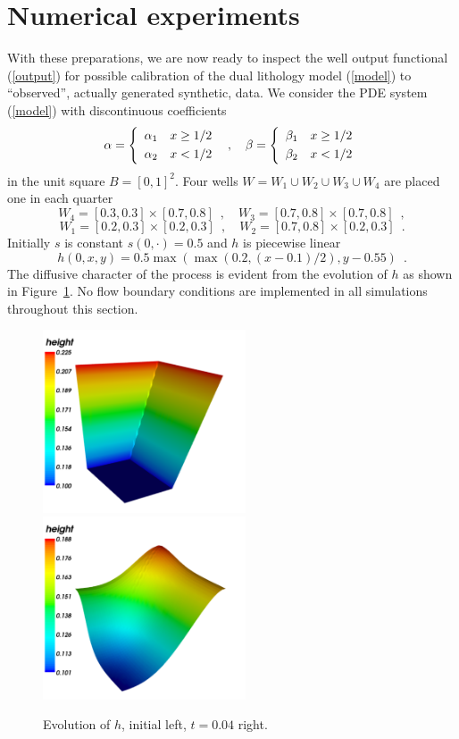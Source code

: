 \section{Numerical experiments}

With these preparations, we are now ready to inspect the well output functional (\ref{output})
for possible calibration of the dual lithology model (\ref{model}) to ``observed'',
actually generated synthetic, data.
We consider the PDE system (\ref{model}) with discontinuous coefficients
$$
 \alpha = \left\{
 \begin{array}{rl} \alpha_1 & x \ge 1/2 \\[\jot] \alpha_2 & x < 1/2 \end{array}
 \right .
 \enspace , \quad
 \beta = \left\{
 \begin{array}{rl} \beta_1 & x \ge 1/2 \\[\jot] \beta_2 & x < 1/2 \end{array}
 \right .
$$
in the unit square $B=[0,1]^2$.
Four wells $W = W_1 \cup W_2 \cup W_3 \cup W_4$
are placed one in each quarter
$$
 W_4 = [0.3, 0.3] \times [0.7, 0.8] \enspace, \quad
 W_3 = [0.7, 0.8] \times [0.7, 0.8] \enspace,
$$
$$
 W_1 = [0.2, 0.3] \times [0.2, 0.3] \enspace, \quad
 W_2 = [0.7, 0.8] \times [0.2, 0.3] \enspace.
$$
Initially $s$ is constant $s(0,\cdot)=0.5$ and $h$ is piecewise linear
$$
 h(0,x,y) = 0.5 \max(\max(0.2, (x-0.1)/2), y-0.55) \enspace .
$$
The diffusive character of the process is evident from the evolution of $h$ as shown in Figure~\ref{fig1}.
No flow boundary conditions are implemented in all simulations throughout this section.
\begin{figure}
  \begin{center}
    \includegraphics[width=6cm]{chapters/schroll/pdf/h0_typical.pdf}
    \includegraphics[width=6cm]{chapters/schroll/pdf/h_typical.pdf}
    \caption{Evolution of $h$, initial left, $t=0.04$ right.}
    \label{fig1}
  \end{center}
\end{figure}

